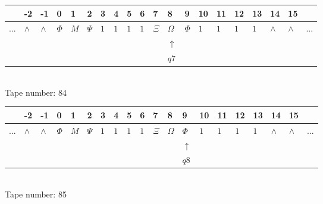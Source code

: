 \documentclass[11pt]{article}
\begin{document}
\begin{table}[H]
\centering
\begin{tabular}{llllllllllllllllllll}
 & -2 & -1 & 0 & 1 & 2 & 3 & 4 & 5 & 6 & 7 & 8 & 9 & 10 & 11 & 12 & 13 & 14 & 15 & \\
\hline
$...$ & \multicolumn{1}{|l|}{$\wedge$} & \multicolumn{1}{|l|}{$\wedge$} & \multicolumn{1}{|l|}{$\Phi$} & \multicolumn{1}{|l|}{$M$} & \multicolumn{1}{|l|}{$\Psi$} & \multicolumn{1}{|l|}{$1$} & \multicolumn{1}{|l|}{$1$} & \multicolumn{1}{|l|}{$1$} & \multicolumn{1}{|l|}{$1$} & \multicolumn{1}{|l|}{$\Xi$} & \multicolumn{1}{|l|}{$\Omega$} & \multicolumn{1}{|l|}{$\Phi$} & \multicolumn{1}{|l|}{$1$} & \multicolumn{1}{|l|}{$1$} & \multicolumn{1}{|l|}{$1$} & \multicolumn{1}{|l|}{$1$} & \multicolumn{1}{|l|}{$\wedge$} & \multicolumn{1}{|l|}{$\wedge$} & $...$\\
\hline
&  &  &  &  &  &  &  &  &  &  & $\uparrow$ &  &  &  &  &  &  &  &  \\
&  &  &  &  &  &  &  &  &  &  & $ q7 $ &  &  &  &  &  &  &  &  \\
\end{tabular}
\\
Tape number: 84
\noindent\makebox[\linewidth]{\hdashrule{\textwidth}{1pt}{1pt}}\end{table}

\begin{table}[H]
\centering
\begin{tabular}{llllllllllllllllllll}
 & -2 & -1 & 0 & 1 & 2 & 3 & 4 & 5 & 6 & 7 & 8 & 9 & 10 & 11 & 12 & 13 & 14 & 15 & \\
\hline
$...$ & \multicolumn{1}{|l|}{$\wedge$} & \multicolumn{1}{|l|}{$\wedge$} & \multicolumn{1}{|l|}{$\Phi$} & \multicolumn{1}{|l|}{$M$} & \multicolumn{1}{|l|}{$\Psi$} & \multicolumn{1}{|l|}{$1$} & \multicolumn{1}{|l|}{$1$} & \multicolumn{1}{|l|}{$1$} & \multicolumn{1}{|l|}{$1$} & \multicolumn{1}{|l|}{$\Xi$} & \multicolumn{1}{|l|}{$\Omega$} & \multicolumn{1}{|l|}{$\Phi$} & \multicolumn{1}{|l|}{$1$} & \multicolumn{1}{|l|}{$1$} & \multicolumn{1}{|l|}{$1$} & \multicolumn{1}{|l|}{$1$} & \multicolumn{1}{|l|}{$\wedge$} & \multicolumn{1}{|l|}{$\wedge$} & $...$\\
\hline
&  &  &  &  &  &  &  &  &  &  &  & $\uparrow$ &  &  &  &  &  &  &  \\
&  &  &  &  &  &  &  &  &  &  &  & $ q8 $ &  &  &  &  &  &  &  \\
\end{tabular}
\\
Tape number: 85
\noindent\makebox[\linewidth]{\hdashrule{\textwidth}{1pt}{1pt}}\end{table}
\end{document}
